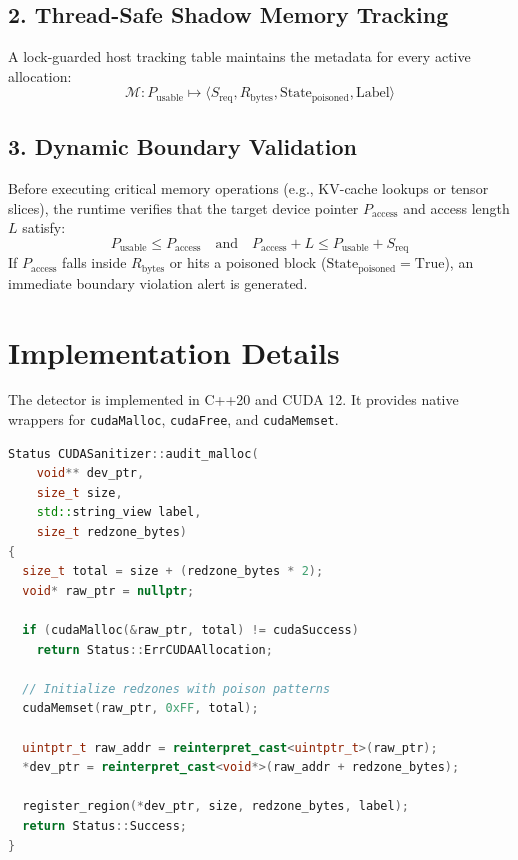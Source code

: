 \documentclass[11pt,a4paper]{article}
\begin{document}
\subsection{2. Thread-Safe Shadow Memory Tracking}
A lock-guarded host tracking table maintains the metadata for every active allocation:
\begin{equation}
\mathcal{M}: P_{\text{usable}} \mapsto \langle S_{\text{req}}, R_{\text{bytes}}, \text{State}_{\text{poisoned}}, \text{Label} \rangle
\end{equation}

\subsection{3. Dynamic Boundary Validation}
Before executing critical memory operations (e.g., KV-cache lookups or tensor slices), the runtime verifies that the target device pointer $P_{\text{access}}$ and access length $L$ satisfy:
\begin{equation}
P_{\text{usable}} \le P_{\text{access}} \quad \text{and} \quad P_{\text{access}} + L \le P_{\text{usable}} + S_{\text{req}}
\end{equation}
If $P_{\text{access}}$ falls inside $R_{\text{bytes}}$ or hits a poisoned block ($\text{State}_{\text{poisoned}} = \text{True}$), an immediate boundary violation alert is generated.

\section{Implementation Details}
The detector is implemented in C++20 and CUDA 12. It provides native wrappers for \texttt{cudaMalloc}, \texttt{cudaFree}, and \texttt{cudaMemset}.

\begin{lstlisting}[language=C++, caption={VRAM Allocation \& Redzone Injection Logic}]
Status CUDASanitizer::audit_malloc(
    void** dev_ptr, 
    size_t size, 
    std::string_view label,
    size_t redzone_bytes) 
{
  size_t total = size + (redzone_bytes * 2);
  void* raw_ptr = nullptr;
  
  if (cudaMalloc(&raw_ptr, total) != cudaSuccess)
    return Status::ErrCUDAAllocation;

  // Initialize redzones with poison patterns
  cudaMemset(raw_ptr, 0xFF, total);

  uintptr_t raw_addr = reinterpret_cast<uintptr_t>(raw_ptr);
  *dev_ptr = reinterpret_cast<void*>(raw_addr + redzone_bytes);

  register_region(*dev_ptr, size, redzone_bytes, label);
  return Status::Success;
}
\end{lstlisting}
\end{document}
